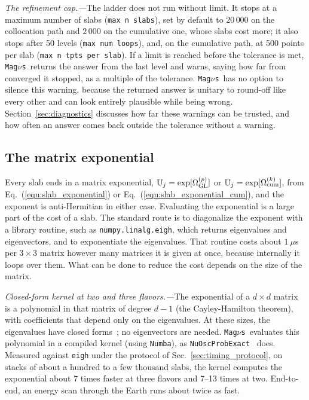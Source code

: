 \documentclass[final,5p,times,twocolumn,sort,compress]{elsarticle}
\makeatletter
\newcommand{\eq}{Eq.}
\DeclareRobustCommand{\_}{%
  \ifmmode\nfss@text{\textunderscore}\else\textunderscore\allowbreak\fi}
\newcommand{\equ}[1]{\eq~(\ref{equ:#1})}
\newcommand{\magnus}{{\tt Mag}\ensuremath{\nu}{\tt s}}
\makeatother
\begin{document}
\smallskip

\textit{The refinement cap.---}The ladder does not run without limit. It stops at a maximum number of slabs ({\tt max\_n\_slabs}), set by default to $20\,000$ on the collocation path and $2\,000$ on the cumulative one, whose slabs cost more; it also stops after 50 levels ({\tt max\_num\_loops}), and, on the cumulative path, at 500 points per slab ({\tt max\_n\_tpts\_per\_slab}). If a limit is reached before the tolerance is met, \magnus\ returns the answer from the last level and warns, saying how far from converged it stopped, as a multiple of the tolerance. \magnus\ has no option to silence this warning, because the returned answer is unitary to round-off like every other and can look entirely plausible while being wrong. Section~\ref{sec:diagnostics} discusses how far these warnings can be trusted, and how often an answer comes back outside the tolerance without a warning.


\subsection{The matrix exponential}
\label{sec:exponential}

Every slab ends in a matrix exponential, $\mathbb{U}_j = \exp[\Omega_{\rm GL}^{(p)}]$ or $\mathbb{U}_j = \exp[\Omega_{\rm cum}^{(k)}]$, from \equ{slab_exponential} or \equ{slab_exponential_cum}, and the exponent is anti-Hermitian in either case. Evaluating the exponential is a large part of the cost of a slab. The standard route is to diagonalize the exponent with a library routine, such as {\tt numpy.linalg.eigh}, which returns eigenvalues and eigenvectors, and to exponentiate the eigenvalues. That routine costs about $1~\mu$s per $3 \times 3$ matrix however many matrices it is given at once, because internally it loops over them. What can be done to reduce the cost depends on the size of the matrix.

\smallskip

\textit{Closed-form kernel at two and three flavors.---}The exponential of a $d \times d$ matrix is a polynomial in that matrix of degree $d - 1$ (the Cayley-Hamilton theorem), with coefficients that depend only on the eigenvalues. At these sizes, the eigenvalues have closed forms\ \cite{Zaglauer:1988gz}; no eigenvectors are needed. \magnus\ evaluates this polynomial in a compiled kernel (using {\tt Numba}), as {\tt NuOscProbExact}~\cite{NuOscProbExact, Bustamante:2019ggq} does. Measured against {\tt eigh} under the protocol of Sec.~\ref{sec:timing_protocol}, on stacks of about a hundred to a few thousand slabs, the kernel computes the exponential about 7 times faster at three flavors and 7--13 times at two. End-to-end, an energy scan through the Earth runs about twice as fast.
\end{document}
